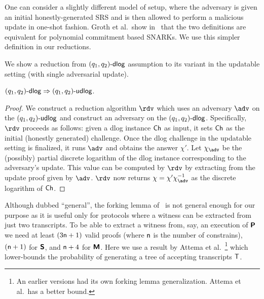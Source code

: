 \begin{remark}\label{rem:upd}
	One can consider a slightly different model of setup, where the adversary is given an initial honestly-generated SRS and is then allowed to perform a malicious update in one-shot fashion.
	Groth
	et al.\ show in~\cite{C:GKMMM18} that the two definitions are equivalent for polynomial commitment based SNARKs. We use this simpler definition in our reductions.
\end{remark}


We show a reduction from $(q_1, q_2)\text{-}\mathsf{dlog}$ assumption to its variant in the updatable setting (with single adversarial update). 
\begin{lemma}
	$(q_1, q_2)\text{-}\mathsf{dlog} \Rightarrow (q_1, q_2)\text{-}\mathsf{udlog}$.
	\end{lemma}
\begin{proof}
	We construct a reduction algorithm $\reduction$ which uses an adversary $\adv$ on the $(q_1, q_2)\text{-}\mathsf{udlog}$ and construct an adversary on the $(q_1, q_2)\text{-}\mathsf{dlog}$. Specifically, $\reduction$ proceeds as follows: given a dlog instance $\mathsf{Ch}$ as input, it sets $\mathsf{Ch}$ as the initial (honestly generated) challenge. Once the dlog challenge in the updatable setting is finalized, it runs $\adv$ and obtains the answer $\chi'$. Let $\chi_\adv$ be the (possibly) partial discrete logarithm of the dlog instance corresponding to the adversary's update. This value can be computed by $\reduction$ by extracting from the update proof given by $\adv$. $\reduction$ now returns $\chi = \chi' \chi_\adv^{-1}$ as the discrete logarithm of $\mathsf{Ch}$.
	\end{proof}

Although dubbed ``general'', the forking lemma of~\cite{CCS:BelNev06} is not general enough for our purpose as it is useful only for protocols where a witness can be extracted from just two transcripts. To be able to extract a witness from, say, an execution of $\bm{\mathsf{P}}$ we need at least $(3 \mathsf{n} + 1)$ valid proofs (where $\mathsf{n}$ is the number of constrains), $(\mathsf{n}+ 1)$ for $\bm{\mathsf{S}}$, and $\mathsf{n} + 4$ for $\bm{\mathsf{M}}$. Here we use a result by Attema et
al.~\cite{EPRINT:AttFehKlo21}\footnote{An earlier versions had its own forking lemma generalization. Attema et al.\ has a better bound.}  which lower-bounds the probability of generating a tree of accepting transcripts $\mathsf{T}$.

